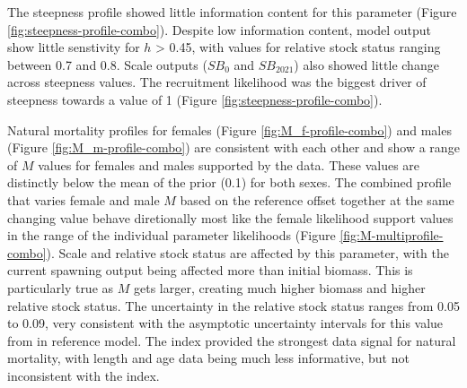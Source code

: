 \documentclass[11pt,
  english,
  a4paper,
]{article}
\begin{document}
\leavevmode\tagmcend\tagstructend\par


The steepness profile showed little information content for this parameter (Figure \ref{fig:steepness-profile-combo}). Despite low information content, model output show little senstivity for {\(h\)\leavevmode\tagmcend\tagstructend} \textgreater{} 0.45, with values for relative stock status ranging between 0.7 and 0.8. Scale outputs ({\(SB_0\)\leavevmode\tagmcend\tagstructend} and {\(SB_2021\)\leavevmode\tagmcend\tagstructend}) also showed little change across steepness values. The recruitment likelihood was the biggest driver of steepness towards a value of 1 (Figure \ref{fig:steepness-profile-combo}).

\leavevmode\tagmcend\tagstructend\par


Natural mortality profiles for females (Figure \ref{fig:M_f-profile-combo}) and males (Figure \ref{fig:M_m-profile-combo}) are consistent with each other and show a range of {\(M\)\leavevmode\tagmcend\tagstructend} values for females and males supported by the data. These values are distinctly below the mean of the prior (0.1) for both sexes. The combined profile that varies female and male {\(M\)\leavevmode\tagmcend\tagstructend} based on the reference offset together at the same changing value behave diretionally most like the female likelihood support values in the range of the individual parameter likelihoods (Figure \ref{fig:M-multiprofile-combo}). Scale and relative stock status are affected by this parameter, with the current spawning output being affected more than initial biomass. This is particularly true as {\(M\)\leavevmode\tagmcend\tagstructend} gets larger, creating much higher biomass and higher relative stock status. The uncertainty in the relative stock status ranges from 0.05 to 0.09, very consistent with the asymptotic uncertainty intervals for this value from in reference model. The index provided the strongest data signal for natural mortality, with length and age data being much less informative, but not inconsistent with the index.
\end{document}
